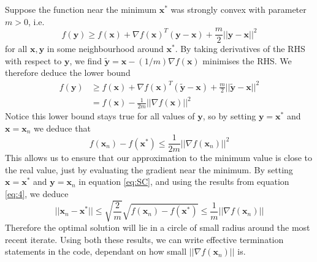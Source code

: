 \documentclass[10pt,a4paper,notitlepage]{article}
\newcommand{\abs}[1]{\lvert#1\rvert}
\newcommand{\x}{\mathbf{x}}
\newcommand{\y}{\mathbf{y}}
\begin{document}
Suppose the function near the minimum $\x^{*}$ was strongly convex with parameter $m>0$, i.e.
\begin{equation}\label{eq:SC}
f(\mathbf{y})\geq f(\mathbf{x}) +\nabla f(\x)^{T}\left(\y-\x\right)+\frac{m}{2}\abs{\abs{\y-\x}}^{2}
\end{equation}
for all $\x,\y$ in some neighbourhood around $\x^{*}$. By taking derivatives of the RHS with respect to $\y$, we find $\widetilde{\y}=\x-(1/m)\nabla f(\x)$ minimises the RHS. We therefore deduce the lower bound
\begin{equation}
\begin{aligned}
f(\y) &\geq f(\x) +\nabla f(\x)^{T}\left(\widetilde{\y}-\x\right) + \frac{m}{2}\abs{\abs{\widetilde{\y}-\x}}^{2}\\
&= f(\x)-\frac{1}{2m}\abs{\abs{\nabla f(\x)}}^{2}
\end{aligned}
\end{equation}
Notice this lower bound stays true for all values of $\y$, so by setting $\y=\x^{*}$ and $\x=\x_{n}$ we deduce that
\begin{equation}\label{eq:4}
f(\x_{n})-f(\x^{*})\leq \frac{1}{2m}\abs{\abs{\nabla f(\x_{n})}}^{2}
\end{equation}
This allows us to ensure that our approximation to the minimum value is close to the real value, just by evaluating the gradient near the minimum. By setting $\x=\x^{*}$ and $\y=\x_{n}$ in equation \eqref{eq:SC}, and using the results from equation \eqref{eq:4}, we deduce
\begin{equation}\label{eq:7}
\abs{\abs{\x_{n}-\x^{*}}}\leq \sqrt{\frac{2}{m}}\sqrt{f(\x_{n})-f(\x^{*})}\leq\frac{1}{m}\abs{\abs{\nabla f(\x_{n})}}
\end{equation}
Therefore the optimal solution will lie in a circle of small radius around the most recent iterate. Using both these results, we can write effective termination statements in the code, dependant on how small $\abs{\abs{\nabla f(\x_{n})}}$ is.\\
\end{document}
